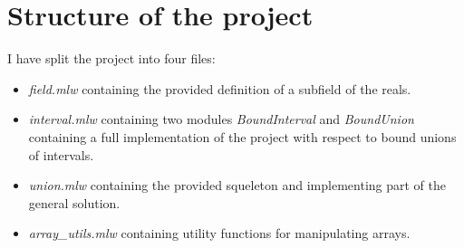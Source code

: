 \section*{Structure of the project}
I have split the project into four files:
\begin{itemize}
  \item \textit{field.mlw} containing the provided definition of a subfield of the
    reals.
  \item \textit{interval.mlw} containing two modules \textit{BoundInterval} and
    \textit{BoundUnion} containing a full implementation of the project with respect
    to bound unions of intervals.
  \item \textit{union.mlw} containing the provided squeleton and implementing part of
    the general solution.
  \item \textit{array\_utils.mlw} containing utility functions for manipulating
    arrays.
\end{itemize}

%
%
